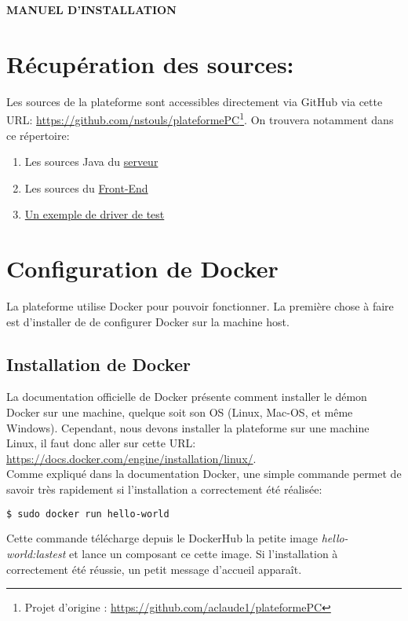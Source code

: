 \documentclass[a4paper]{article}
\begin{document}
\begin{center}
\textsc{\LARGE{\textbf{MANUEL D'INSTALLATION}}}\\[2cm]
\end{center}

\section{Récupération des sources:}
Les sources de la plateforme sont accessibles directement via GitHub via cette URL: 
\url{https://github.com/nstouls/plateformePC}\footnote{Projet d'origine : \url{https://github.com/aclaude1/plateformePC}}. On trouvera notamment dans ce répertoire:
\begin{enumerate}
\item Les sources Java du \href{https://github.com/nstouls/plateformePC/tree/master/src/main/java/io/vertx/blog/plateforme}{serveur}
\item Les sources du \href{https://github.com/nstouls/plateformePC/tree/master/ressources}{Front-End}
\item \href{https://github.com/nstouls/plateformePC/tree/master/Exemple_HelloWorld}{Un exemple de driver de test}
\end{enumerate}

\section{Configuration de Docker}
La plateforme utilise Docker pour pouvoir fonctionner. La première chose à faire est d'installer de de configurer Docker sur la machine host.
\subsection{Installation de Docker}
La documentation officielle de Docker présente comment installer le démon Docker sur une machine, quelque soit son OS (Linux, Mac-OS, et même Windows). Cependant, nous devons installer la plateforme sur une machine Linux, il faut donc aller sur cette URL: \url{https://docs.docker.com/engine/installation/linux/}. \\
Comme expliqué dans la documentation Docker, une simple commande permet de savoir très rapidement si l'installation a correctement été réalisée:
\begin{lstlisting}[language=bash]
  $ sudo docker run hello-world
\end{lstlisting}
Cette commande télécharge depuis le DockerHub la petite image \textit{hello-world:lastest} et lance un composant ce cette image. Si l'installation à correctement été réussie, un petit message d'accueil apparaît.
\end{document}
